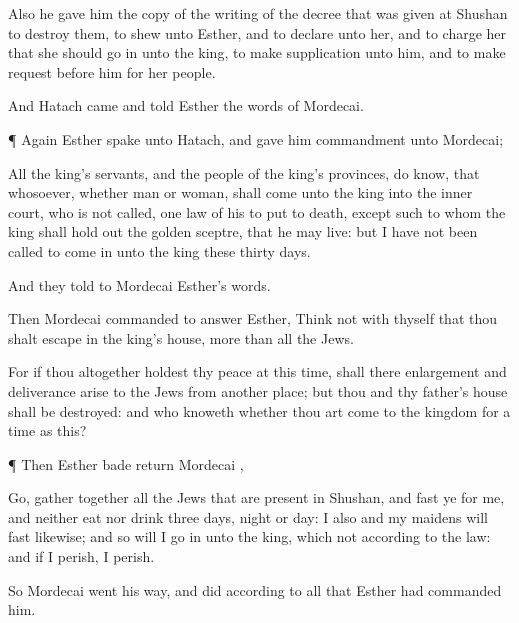 {Also he
gave him the
copy of the
writing of the
decree that was
given at
Shushan to
destroy them, to
shew
{} unto
Esther, and to
declare
{} unto her, and to
charge her that she should go
in unto the
king, to make
supplication unto him, and to make
request
before him for her
people.

And
Hatach
came and
told
Esther the
words of
Mordecai.


\par }{\PP {}¶ Again
Esther
spake unto
Hatach, and gave him
commandment unto
Mordecai;

All the
king’s
servants, and the
people of the
king’s
provinces, do
know, that whosoever, whether
man or
woman, shall
come unto the
king into the
inner
court, who is not
called,
{}
one
law of his to put
{} to
death,
except such to whom the
king shall hold
out the
golden
sceptre, that he may
live: but I have not been
called to come
in unto the
king these
thirty
days.

And they
told to
Mordecai
Esther’s
words.

Then
Mordecai
commanded to
answer
Esther,
Think not with
thyself that thou shalt
escape in the
king’s
house, more than all the
Jews.

For if thou
altogether holdest thy
peace at this
time,
{} shall there
enlargement and
deliverance
arise to the
Jews from
another
place; but thou and thy
father’s
house shall be
destroyed: and who
knoweth whether thou art
come to the
kingdom for
{} a
time as this?


\par }{\PP {}¶ Then
Esther
bade
{}
return
Mordecai
{},

Go, gather
together all the
Jews that are
present in
Shushan, and
fast ye for me, and neither
eat nor
drink
three
days,
night or
day: I also and my
maidens will
fast likewise; and
so will I
go in unto the
king, which
{} not according to the
law: and if I
perish, I
perish.

So
Mordecai went his
way, and
did according to all that
Esther had
commanded him.




\par }
